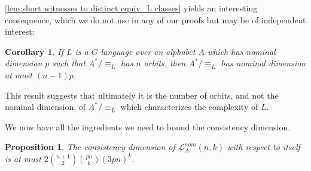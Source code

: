 \documentclass[11pt,a4paper]{amsart}
\newtheorem{proposition}{Proposition}
\newtheorem{corollary}{Corollary}
\theoremstyle{definition}
\newcommand{\mc}{\mathcal}
\newif\ifappendix
\begin{document}
\autoref{lem:short witnesses to distinct equiv_L classes} yields an interesting consequence, which we do not use in any of our proofs but may be of independent interest:

\begin{corollary} \label{cor:dimension of A^*/equiv_L bounded in terms of orbits}
    If $L$ is a $G$-language over an alphabet $A$ which has nominal dimension $p$ such that $A^* / \equiv_L$ has $n$ orbits, then $A^* / \equiv_L$ has nominal dimension at most $(n-1)p$.
\end{corollary}

This result suggests that ultimately it is the number of orbits, and not the nominal dimension, of $A^* / \equiv_L$ which characterizes the complexity of $L$.
\ifappendix Its proof is given in Appendix \ref{appendix:proof of dimension of A^*/equiv_L bounded in terms of orbits}. \fi

\bigskip

We now have all the ingredients we need to bound the consistency dimension.

\begin{proposition} \label{prop:consistency dimension of nominal automata}
    The consistency dimension of $\mc L^{nom}_A(n,k)$ with respect to itself is at most $2 \binom{n+1}{2} \binom{pn}{k} (3pn)^k$.
\end{proposition}
\end{document}
